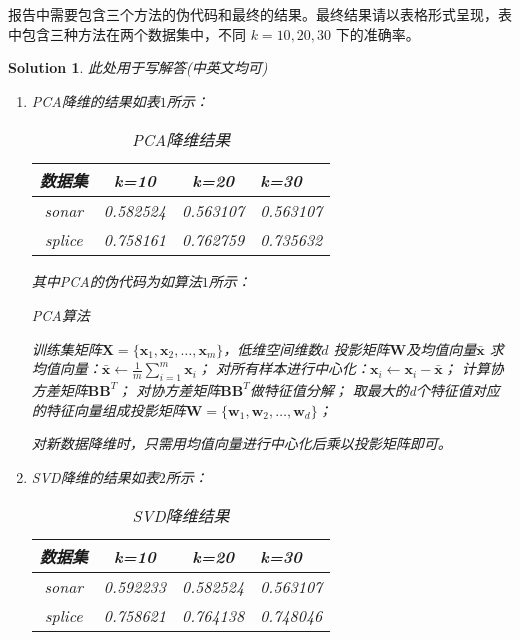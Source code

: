 \documentclass[a4paper,UTF8]{article}
\numberwithin{equation}{section}
\newtheorem*{solution}{Solution}
\begin{document}
报告中需要包含三个方法的伪代码和最终的结果。最终结果请以表格形式呈现，表中包含三种方法在两个数据集中，不同 $k=10,20,30$ 下的准确率。
\newpage

\begin{solution}
	此处用于写解答(中英文均可)
	\begin{enumerate}
	\item PCA降维的结果如表$1$所示：
	\begin{table}[htbp]
  		\centering
  		\begin{tabular}{cccp{38mm}}
	    \toprule
	    \textbf{数据集} & \textbf{k=10} & \textbf{k=20} & \textbf{k=30} \\
	    \midrule
	    sonar  & 0.582524 & 0.563107 & 0.563107\\
	    splice & 0.758161 & 0.762759 & 0.735632\\
	    \bottomrule
  		\end{tabular}
  		\caption{PCA降维结果}\label{table:1}
	\end{table}

	其中PCA的伪代码为如算法$1$所示：
	   	\begin{algorithm}[htbp]  
	        \caption{PCA算法}  
	        \begin{algorithmic}[1] %
	            \Require 训练集矩阵$\mathbf{X}=\{\mathbf{x}_1, \mathbf{x}_2,\dots,\mathbf{x}_m\}$，低维空间维数$d$ 
	            \Ensure 投影矩阵$\mathbf{W}$及均值向量$\bar{\mathbf{x}}$  
	            \State 求均值向量：$\bar{\mathbf{x}} \gets \frac{1}{m}\sum_{i=1}^{m}\mathbf{x}_i$；
	            \State 对所有样本进行中心化：$\mathbf{x}_i \gets \mathbf{x}_i - \bar{\mathbf{x}}$；
	            \State 计算协方差矩阵$\mathbf{B}\mathbf{B}^T$；
	            \State 对协方差矩阵$\mathbf{B}\mathbf{B}^T$做特征值分解；
	            \State 取最大的d个特征值对应的特征向量组成投影矩阵$\mathbf{W}=\{\mathbf{w}_1, \mathbf{w}_2,\dots,\mathbf{w}_d\}$；
	            \State {}
	        \end{algorithmic}  
    	\end{algorithm} 

    对新数据降维时，只需用均值向量进行中心化后乘以投影矩阵即可。
	\item SVD降维的结果如表$2$所示：
	\begin{table}[htbp]
  		\centering
  		\begin{tabular}{cccp{38mm}}
	    \toprule
	    \textbf{数据集} & \textbf{k=10} & \textbf{k=20} & \textbf{k=30} \\
	    \midrule
	    sonar  & 0.592233 & 0.582524 & 0.563107\\
	    splice & 0.758621 & 0.764138 & 0.748046\\
	    \bottomrule
  		\end{tabular}
  		\caption{SVD降维结果}\label{table:1}
	\end{table}


\end{enumerate}
\end{solution}
\end{document}
